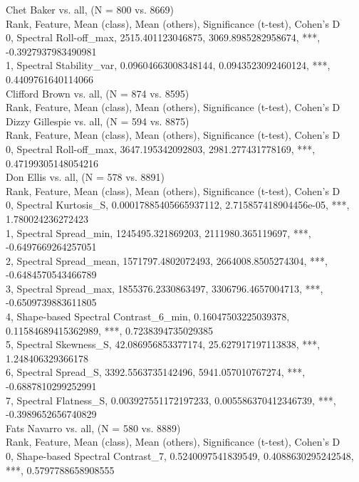 Chet Baker vs. all, (N = 800 vs. 8669)\\
Rank, Feature, Mean (class), Mean (others), Significance (t-test), Cohen's D\\
0, Spectral Roll-off_max, 2515.401123046875, 3069.8985282958674, ***, -0.3927937983490981\\
1, Spectral Stability_var, 0.09604663008348144, 0.0943523092460124, ***, 0.4409761640114066\\
Clifford Brown vs. all, (N = 874 vs. 8595)\\
Rank, Feature, Mean (class), Mean (others), Significance (t-test), Cohen's D\\
Dizzy Gillespie vs. all, (N = 594 vs. 8875)\\
Rank, Feature, Mean (class), Mean (others), Significance (t-test), Cohen's D\\
0, Spectral Roll-off_max, 3647.195342092803, 2981.277431778169, ***, 0.47199305148054216\\
Don Ellis vs. all, (N = 578 vs. 8891)\\
Rank, Feature, Mean (class), Mean (others), Significance (t-test), Cohen's D\\
0, Spectral Kurtosis_S, 0.00017885405665937112, 2.715857418904456e-05, ***, 1.780024236272423\\
1, Spectral Spread_min, 1245495.321869203, 2111980.365119697, ***, -0.6497669264257051\\
2, Spectral Spread_mean, 1571797.4802072493, 2664008.8505274304, ***, -0.6484570543466789\\
3, Spectral Spread_max, 1855376.2330863497, 3306796.4657004713, ***, -0.6509739883611805\\
4, Shape-based Spectral Contrast_6_min, 0.16047503225039378, 0.11584689415362989, ***, 0.7238394735029385\\
5, Spectral Skewness_S, 42.086956853377174, 25.627917197113838, ***, 1.248406329366178\\
6, Spectral Spread_S, 3392.5563735142496, 5941.057010767274, ***, -0.6887810299252991\\
7, Spectral Flatness_S, 0.003927551172197233, 0.005586370412346739, ***, -0.3989652656740829\\
Fats Navarro vs. all, (N = 580 vs. 8889)\\
Rank, Feature, Mean (class), Mean (others), Significance (t-test), Cohen's D\\
0, Shape-based Spectral Contrast_7, 0.5240097541839549, 0.4088630295242548, ***, 0.5797788658908555\\
